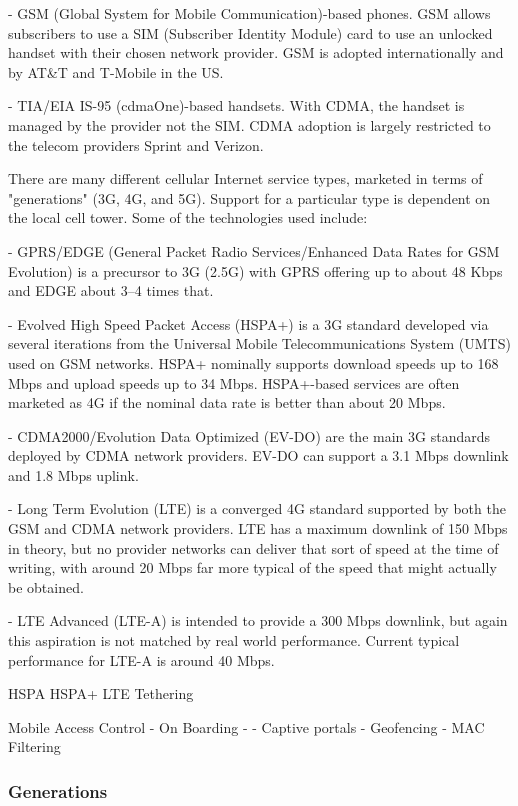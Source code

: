 - GSM (Global System for Mobile Communication)-based phones. GSM allows
subscribers to use a SIM (Subscriber Identity Module) card to use an unlocked
handset with their chosen network provider. GSM is adopted internationally and
by AT\&T and T-Mobile in the US.

- TIA/EIA IS-95 (cdmaOne)-based handsets. With CDMA, the handset is managed by
the provider not the SIM. CDMA adoption is largely restricted to the telecom
providers Sprint and Verizon. 

There are many different cellular Internet service types, marketed in terms of
"generations" (3G, 4G, and 5G). Support for a particular type is dependent on
the local cell tower. Some of the technologies used include:


- GPRS/EDGE (General Packet Radio Services/Enhanced Data Rates for GSM
Evolution) is a precursor to 3G (2.5G) with GPRS offering up to about 48 Kbps
and EDGE about 3–4 times that.  

- Evolved High Speed Packet Access (HSPA+) is a 3G standard developed via
several iterations from the Universal Mobile Telecommunications System (UMTS)
used on GSM networks. HSPA+ nominally supports download speeds up to 168 Mbps
and upload speeds up to 34 Mbps. HSPA+-based services are often marketed as 4G
if the nominal data rate is better than about 20 Mbps.

- CDMA2000/Evolution Data Optimized (EV-DO) are the main 3G standards deployed
by CDMA network providers. EV-DO can support a 3.1 Mbps downlink and 1.8 Mbps
uplink.

- Long Term Evolution (LTE) is a converged 4G standard supported by both the GSM
and CDMA network providers. LTE has a maximum downlink of 150 Mbps in theory,
but no provider networks can deliver that sort of speed at the time of writing,
with around 20 Mbps far more typical of the speed that might actually be
obtained.

- LTE Advanced (LTE-A) is intended to provide a 300 Mbps downlink, but again
this aspiration is not matched by real world performance. Current typical
performance for LTE-A is around 40 Mbps.



HSPA
HSPA+
LTE
Tethering

Mobile Access Control
- On Boarding
- - Captive portals
- Geofencing
- MAC Filtering




\subsubsection{Generations}
\label{sssec:generations}

